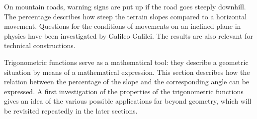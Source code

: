 \begin{MIntro}

On mountain roads, warning signs are put up if the road goes steeply downhill.
The percentage describes how steep the terrain slopes compared to a horizontal 
movement. Questions for the conditions of movements on an inclined plane in physics 
have been investigated by Galileo Galilei. The results are also relevant for 
technical constructions.

Trigonometric functions serve as a mathematical tool: they describe a geometric 
situation by means of a mathematical expression.
This section describes how the relation between the percentage of the slope and 
the corresponding angle can be expressed. A first investigation of the properties 
of the trigonometric functions gives an idea of the various possible applications
far beyond geometry, which will be revisited repeatedly in the later sections. 
\end{MIntro}

